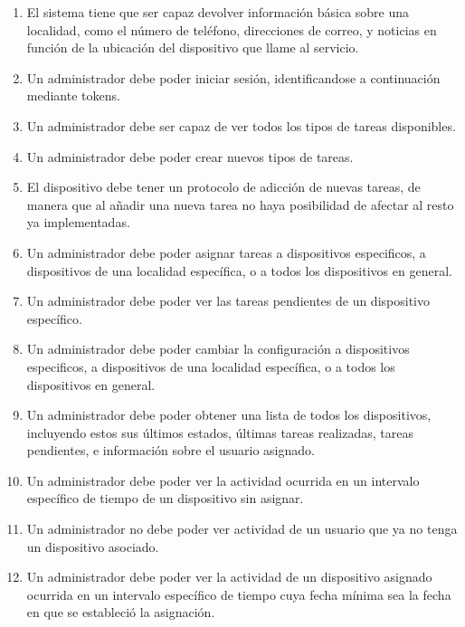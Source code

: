 \begin{enumerate}
    \item El sistema tiene que ser capaz devolver información básica sobre una localidad, como el número de teléfono, direcciones de correo, y noticias en función de la ubicación del dispositivo que llame al servicio.
    
    \item Un administrador debe poder iniciar sesión, identificandose a continuación mediante tokens.
    
    \item Un administrador debe ser capaz de ver todos los tipos de tareas disponibles.
    
    \item Un administrador debe poder crear nuevos tipos de tareas.
    
    \item El dispositivo debe tener un protocolo de adicción de nuevas tareas, de manera que al añadir una nueva tarea no haya posibilidad de afectar al resto ya implementadas.
    
    \item Un administrador debe poder asignar tareas a dispositivos especificos, a dispositivos de una localidad específica, o a todos los dispositivos en general.
    
    \item Un administrador debe poder ver las tareas pendientes de un dispositivo específico.
    
    \item Un administrador debe poder cambiar la configuración a dispositivos especificos, a dispositivos de una localidad específica, o a todos los dispositivos en general.
    
    \item Un administrador debe poder obtener una lista de todos los dispositivos, incluyendo estos sus últimos estados, últimas tareas realizadas, tareas pendientes, e información sobre el usuario asignado.
    
    \item Un administrador debe poder ver la actividad ocurrida en un intervalo específico de tiempo de un dispositivo sin asignar.
    
    \item Un administrador no debe poder ver actividad de un usuario que ya no tenga un dispositivo asociado.
    
    \item Un administrador debe poder ver la actividad de un dispositivo asignado ocurrida en un intervalo específico de tiempo cuya fecha mínima sea la fecha en que se estableció la asignación.
    

\end{enumerate}
